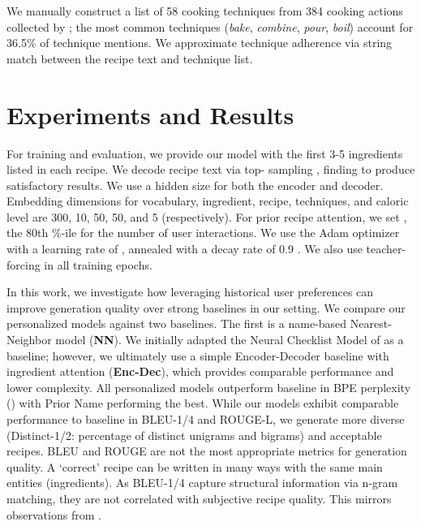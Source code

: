 \documentclass[11pt,a4paper]{article}
\begin{document}
We manually construct a list of 58 cooking techniques from 384 cooking actions collected by \citet{DBLP:conf/iclr/BosselutLHEFC18}; the most common techniques (\textit{bake}, \textit{combine}, \textit{pour}, \textit{boil}) account for 36.5\% of technique mentions.
We approximate technique adherence via string match between the recipe text and technique list.

\section{Experiments and Results}
For training and evaluation, we provide our model with the first 3-5 ingredients listed in each recipe.
We decode recipe text via top- sampling \cite{radford2019language}, finding  to produce satisfactory results.
We use a hidden size  for both the encoder and decoder.
Embedding dimensions for vocabulary, ingredient, recipe, techniques, and caloric level are 300, 10, 50, 50, and 5 (respectively).
For prior recipe attention, we set , the 80th \%-ile for the number of user interactions.
We use the Adam optimizer \cite{DBLP:journals/corr/KingmaB14} with a learning rate of , annealed with a decay rate of 0.9 \cite{DBLP:conf/acl/RuderH18}.
We also use teacher-forcing \cite{DBLP:journals/neco/WilliamsZ89} in all training epochs.

In this work, we investigate how leveraging historical user preferences can improve generation quality over strong baselines in our setting.
We compare our personalized models against two baselines.
The first is a name-based Nearest-Neighbor model (\textbf{NN}).
We initially adapted the Neural Checklist Model of \citet{kiddon2016globally} as a baseline; however, we ultimately use a simple Encoder-Decoder baseline with ingredient attention (\textbf{Enc-Dec}), which provides comparable performance and lower complexity.
All personalized models outperform baseline in BPE perplexity () with Prior Name performing the best.
While our models exhibit comparable performance to baseline in BLEU-1/4 and ROUGE-L, we generate more diverse (Distinct-1/2: percentage of distinct unigrams and bigrams) and acceptable recipes.
BLEU and ROUGE are not the most appropriate metrics for generation quality.
A `correct' recipe can be written in many ways with the same main entities (ingredients).
As BLEU-1/4 capture structural information via n-gram matching, they are not correlated with subjective recipe quality.
This mirrors observations from \citet{DBLP:conf/emnlp/BahetiRLD18, DBLP:conf/acl/LewisDF18}.
\end{document}
